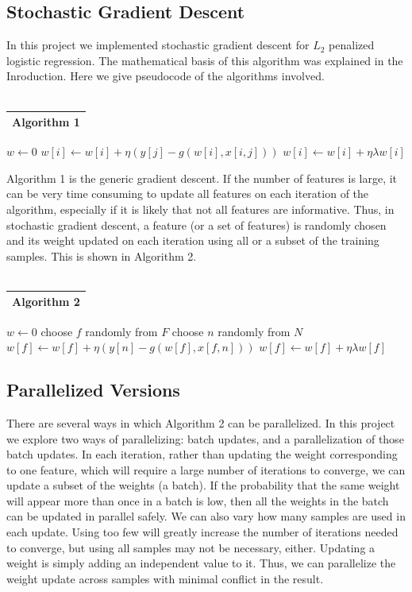 \documentclass{article}
\begin{document}
\subsection{Stochastic Gradient Descent}
In this project we implemented stochastic gradient descent for $L_2$ penalized logistic regression. The mathematical basis of this algorithm was explained in the Inroduction. Here we give pseudocode of the algorithms involved.
\\
\\
\begin{tabular} {l}
\hline
\hline
Algorithm 1 \\
\hline
\end{tabular}
\begin{algorithmic}
\STATE $w \leftarrow 0$ 
\STATE $w[i] \leftarrow w[i] + \eta(y[j] - g(w[i], x[i, j]))$ 
\ENDFOR 
\STATE $w[i] \leftarrow w[i] + \eta\lambda w[i]$ 
\ENDFOR 
\ENDWHILE 
\end{algorithmic}
Algorithm 1 is the generic gradient descent. If the number of features is large, it can be very time consuming to update all features on each iteration of the algorithm, especially if it is likely that not all features are informative.  Thus, in stochastic gradient descent, a feature (or a set of features) is randomly chosen and its weight updated on each iteration using all or a subset of the training samples. This is shown in Algorithm 2.
\\
\\
\begin{tabular}{l}
\hline
\hline
Algorithm 2 \\
\hline
\end{tabular}
\begin{algorithmic}
\STATE $w \leftarrow 0$
\STATE choose $f$ randomly from $F$
\STATE choose $n$ randomly from $N$
\STATE $w[f] \leftarrow w[f] + \eta(y[n] - g(w[f], x[f, n]))$
\ENDFOR
\STATE $w[f] \leftarrow w[f] + \eta\lambda w[f]$
\ENDFOR
\ENDFOR
\end{algorithmic}
\subsection{Parallelized Versions}
There are several ways in which Algorithm 2 can be parallelized. In this project we explore two ways of parallelizing: batch updates, and a parallelization of those batch updates.  In each iteration, rather than updating the weight corresponding to one feature, which will require a large number of iterations to converge, we can update a subset of the weights (a batch).  If the probability that the same weight will appear more than once in a batch is low, then all the weights in the batch can be updated in parallel safely. We can also vary how many samples are used in each update.  Using too few will greatly increase the number of iterations needed to converge, but using all samples may not be necessary, either.  Updating a weight is simply adding an independent value to it.  Thus, we can parallelize the weight update across samples with minimal conflict in the result.
\end{document}
